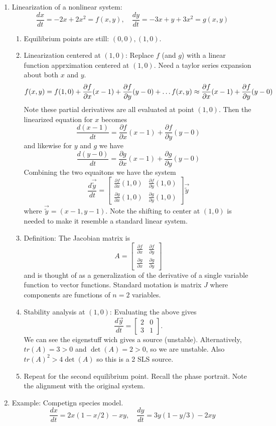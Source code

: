 \documentclass{article}
\begin{document}
\begin{enumerate}
\item Linearization of a nonlinear system:
\[
\frac{dx}{dt} = -2x+2x^2=f(x,y), \quad \frac{dy}{dt}=-3x+y+3x^2=g(x,y)
\]
\begin{enumerate}
\item Equilibrium points are still: $(0,0), (1,0)$.
\item Linearization centered at $(1,0)$: Replace $f$ (and $g$) with a linear function apprximation centered at $(1,0)$. Need a taylor series expansion about both $x$ and $y$.
\[
f(x,y)=f(1,0)+\frac{\partial f}{\partial x} (x-1) + \frac{\partial f}{\partial y} (y-0) + \dots \\ 
f(x,y) \approx \frac{\partial f}{\partial x} (x-1) + \frac{\partial f}{\partial y} (y-0) 
\]
Note these partial derivatives are all evaluated at point $(1,0)$.
Then the linearized equation for $x$ becomes
\[
\frac{d(x-1)}{dt} = \frac{\partial f}{\partial x} (x-1) + \frac{\partial f}{\partial y} (y-0) 
\]
and likewise for $y$ and $g$ we have
\[
\frac{d(y-0)}{dt} = \frac{\partial g}{\partial x} (x-1) + \frac{\partial g}{\partial y} (y-0) 
\]
Combining the two equaitons we have the system
\[
\frac{d\vec{\tilde{y}}}{dt} = \begin{bmatrix}
\frac{\partial f}{\partial x} (1,0) & \frac{\partial f}{\partial y} (1,0) \\
\frac{\partial g}{\partial x} (1,0) & \frac{\partial g}{\partial y} (1,0) 
\end{bmatrix}
\vec{\tilde{y}}
\]
where $\vec{\tilde{y}} = (x-1,y-1)$. Note the shifting to center at $(1,0)$ is needed to make it resemble a standard linear system.

\item Definition: The Jacobian matrix is
\[
A = \begin{bmatrix}
\frac{\partial f}{\partial x}  & \frac{\partial f}{\partial y}  \\
\frac{\partial g}{\partial x}  & \frac{\partial g}{\partial y} 
\end{bmatrix}
\]
and is thought of as a generalization of the derivative of a single variable function to vector functions. Standard motation is matrix $J$ where components are functions of $n=2$ variables.

\item Stability analysis at $(1,0)$: Evaluating the above gives
\[
\frac{d \vec{y}}{dt} = \begin{bmatrix}
2 & 0 \\
3 & 1
\end{bmatrix}.
\]
We can see the eigenstuff wich gives a source (unstable). Alternatively, $tr(A)=3>0$ and $\det(A)=2>0$, so we are unstable. Also $tr(A)^2>4\det(A)$ so this is a 2 SLS source.

\item Repeat for the second equilibrium point. Recall the phase portrait. Note the alignment with the original system.
\end{enumerate}

\item Example: Competign species model.
\[
\frac{dx}{dt} = 2x(1-x/2)-xy, \quad \frac{dy}{dt}=3y(1-y/3)-2xy
\]
\end{enumerate}
\end{document}
